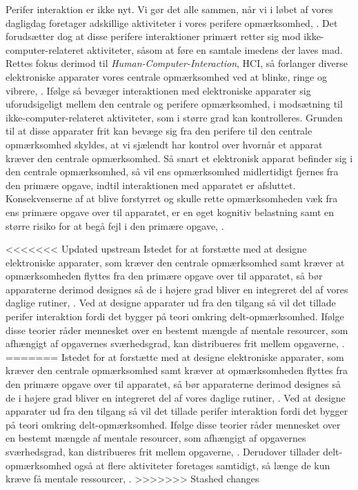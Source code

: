 Perifer interaktion er ikke nyt. Vi gør det alle sammen, når vi i løbet af vores dagligdag foretager adskillige aktiviteter i vores perifere opmærksomhed, \parencite[s. 1]{PDF:PeripheralInteraction}. Det forudsætter dog at disse perifere interaktioner primært retter sig mod ikke-computer-relateret aktiviteter, såsom at føre en samtale imedens der laves mad. Rettes fokus derimod til \textit{Human-Computer-Interaction}, HCI, så forlanger diverse elektroniske apparater vores centrale opmærksomhed ved at blinke, ringe og vibrere, \parencite[s. 1]{PDF:PeripheralInteraction}. Ifølge \textcite[s. 3]{PDF:PeripheralInteraction} så bevæger interaktionen med elektroniske apparater sig uforudsigeligt mellem den centrale og perifere opmærksomhed, i modsætning til ikke-computer-relateret aktiviteter, som i større grad kan kontrolleres. Grunden til at disse apparater frit kan bevæge sig fra den perifere til den centrale opmærksomhed skyldes, at vi sjælendt har kontrol over hvornår et apparat kræver den centrale opmærksomhed. Så snart et elektronisk apparat befinder sig i den centrale opmærksomhed, så vil ens opmærksomhed midlertidigt fjernes fra den primære opgave, indtil interaktionen med apparatet er afsluttet. Konsekvenserne af at blive forstyrret og skulle rette opmærksomheden væk fra ens primære opgave over til apparatet, er en øget kognitiv belastning samt en større risiko for at begå fejl i den primære opgave, \parencite[ss. 188-189][s. 162]{PDF:PeripheralInteraction, PDF:ComparingInputModalities}. 

<<<<<<< Updated upstream
Istedet for at forstætte med at designe elektroniske apparater, som kræver den centrale opmærksomhed samt kræver at opmærksomheden flyttes fra den primære opgave over til apparatet, så bør apparaterne derimod designes så de i højere grad bliver en integreret del af vores daglige rutiner, \parencite[s. 239]{PDF:PICharacteristicsAndConsiderations}. Ved at designe apparater ud fra den tilgang så vil det tillade perifer interaktion fordi det bygger på teori omkring delt-opmærksomhed. Ifølge disse teorier råder mennesket over en bestemt mængde af mentale resourcer, som afhængigt af opgavernes sværhedsgrad, kan distribueres frit mellem opgaverne, \parencite[s. 240]{PDF:PICharacteristicsAndConsiderations}.  
=======
Istedet for at forstætte med at designe elektroniske apparater, som kræver den centrale opmærksomhed samt kræver at opmærksomheden flyttes fra den primære opgave over til apparatet, så bør apparaterne derimod designes så de i højere grad bliver en integreret del af vores daglige rutiner, \parencite[s. 239]{PDF:PICharacteristicsAndConsiderations}. Ved at designe apparater ud fra den tilgang så vil det tillade perifer interaktion fordi det bygger på teori omkring delt-opmærksomhed. Ifølge disse teorier råder mennesket over en bestemt mængde af mentale resourcer, som afhængigt af opgavernes sværhedsgrad, kan distribueres frit mellem opgaverne, \parencite[s. 240]{PDF:PICharacteristicsAndConsiderations}. Derudover tillader delt-opmærksomhed også at flere aktiviteter foretages samtidigt, så længe de kun kræve få mentale ressourcer, \parencite[s. 2]{PDF:FacilitatingPIDesignAnEvaluation}. 
>>>>>>> Stashed changes



